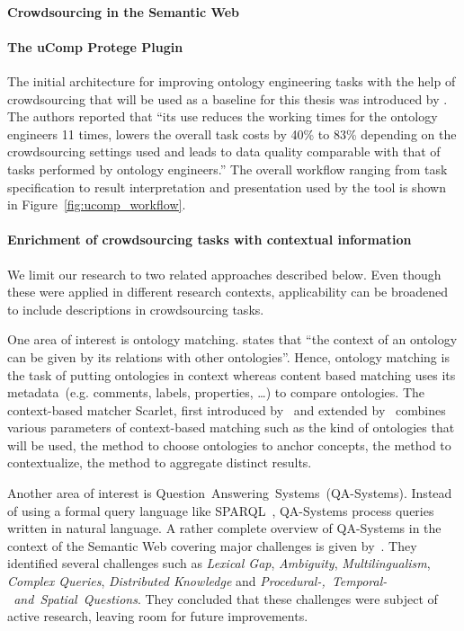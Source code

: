 \documentclass[12pt, notitlepage]{article}
\begin{document}
\paragraph{Crowdsourcing in the Semantic Web}

\paragraph{The uComp Protege Plugin}
The initial architecture for improving ontology engineering tasks with the help of crowdsourcing that will be used as a baseline for this thesis was introduced by \citet{wohlgenannt2016crowd}. The authors reported that \enquote{its use reduces the working times for the ontology engineers 11 times, lowers the overall task costs by 40\% to 83\% depending on the crowdsourcing settings used and leads to data quality comparable with that of tasks performed by ontology engineers.} The overall workflow ranging from task specification to result interpretation and presentation used by the tool is shown in Figure~\ref{fig:ucomp_workflow}.

\paragraph{Enrichment of crowdsourcing tasks with contextual information}
We limit our research to two related approaches described below. Even though these were applied in different research contexts, applicability can be broadened to include descriptions in crowdsourcing tasks.

One area of interest is ontology matching. \citet{hoffmann2010context} states that \enquote{the context of an ontology can be given by its relations with other ontologies}. Hence, ontology matching is the task of putting ontologies in context whereas content based matching uses its metadata~(e.g. comments, labels, properties, \ldots) to compare ontologies. The context-based matcher Scarlet, first introduced by~\citet{sabou2008scarlet} and extended by~\citet{hoffmann2010context} combines various parameters of context-based matching such as the kind of ontologies that will be used, the method to choose ontologies to anchor concepts, the method to contextualize, the method to aggregate distinct results. 

Another area of interest is Question~Answering~Systems~(QA-Systems). Instead of using a formal query language like SPARQL~\cite{harris2013sparql}, QA-Systems process queries written in natural language. A rather complete overview of QA-Systems in the context of the Semantic Web covering major challenges is given by~\citet{hoffner2016survey}. They identified several challenges such as \emph{Lexical Gap}, \emph{Ambiguity}, \emph{Multilingualism}, \emph{Complex Queries}, \emph{Distributed Knowledge} and \emph{Procedural-,~Temporal-~and~Spatial~Questions}. They concluded that these challenges were subject of active research, leaving room for future improvements. 
\end{document}
